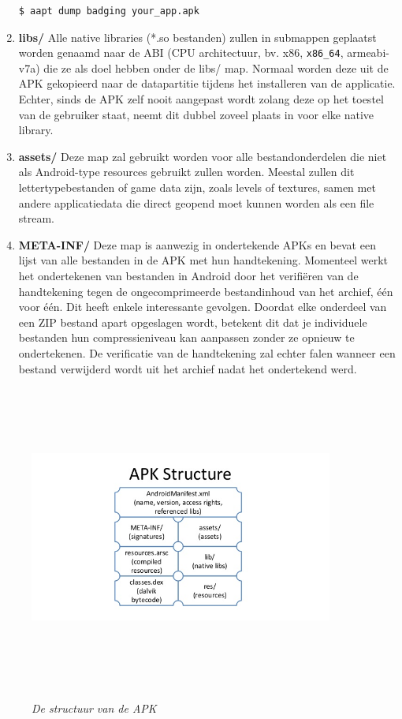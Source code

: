 \begin{enumerate}
\begin{lstlisting}[backgroundcolor = \color{lightgray}, xleftmargin = 2cm,
framexleftmargin = 1em]
$ aapt dump badging your_app.apk
\end{lstlisting}
\item \textbf{libs/}\newline
Alle native libraries (*.so bestanden) zullen in submappen geplaatst worden genaamd naar de ABI (CPU architectuur, bv. x86, \texttt{x86\_64}, armeabi-v7a) die ze als doel hebben onder de libs/ map. Normaal worden deze uit de APK gekopieerd naar de datapartitie tijdens het installeren van de applicatie. Echter, sinds de APK zelf nooit aangepast wordt zolang deze op het toestel van de gebruiker staat, neemt dit dubbel zoveel plaats in voor elke native library. 
\item \textbf{assets/}\newline
Deze map zal gebruikt worden voor alle bestandonderdelen die niet als Android-type resources gebruikt zullen worden. Meestal zullen dit lettertypebestanden of game data zijn, zoals levels of textures, samen met andere applicatiedata die direct geopend moet kunnen worden als een file stream.
\item \textbf{META-INF/}\newline
Deze map is aanwezig in ondertekende APKs en bevat een lijst van alle bestanden in de APK met hun handtekening. Momenteel werkt het ondertekenen van bestanden in Android door het verifiëren van de handtekening tegen de ongecomprimeerde bestandinhoud van het archief, één voor één. Dit heeft enkele interessante gevolgen. Doordat elke onderdeel van een ZIP bestand apart opgeslagen wordt, betekent dit dat je individuele bestanden hun compressieniveau kan aanpassen zonder ze opnieuw te ondertekenen. De verificatie van de handtekening zal echter falen wanneer een bestand verwijderd wordt uit het archief nadat het ondertekend werd. 
\end{enumerate}
\begin{figure}[h]
	\caption{\textit{De structuur van de APK}}
	\includegraphics[width=10cm, height=10cm, keepaspectratio]{img/ApkStructure}\\[.5cm]
	\centering
\end{figure}

